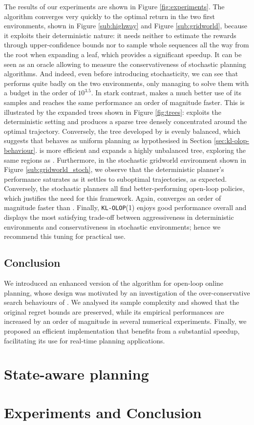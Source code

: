 The results of our experiments are shown in Figure \ref{fig:experiments}. The \OPD algorithm converges very quickly to the optimal return in the two first environments, shown in Figure \ref{sub:highway} and Figure \ref{sub:gridworld}, because it exploits their deterministic nature: it needs neither to estimate the rewards through upper-confidence bounds nor to sample whole sequences all the way from the root when expanding a leaf, which provides a significant speedup. It can be seen as an oracle allowing to measure the conservativeness of stochastic planning algorithms. And indeed, even before introducing stochasticity, we can see that \OLOP performs quite badly on the two environments, only managing to solve them with a budget in the order of $10^{3.5}$. In stark contrast, \KLOLOP makes a much better use of its samples and reaches the same performance an order of magnitude faster. This is illustrated by the expanded trees shown in Figure \ref{fig:trees}: \OPD exploits the deterministic setting and produces a sparse tree densely concentrated around the optimal trajectory. Conversely, the tree developed by \OLOP is evenly balanced, which suggests that \OLOP behaves as uniform planning as hypothesised in Section \ref{sec:kl-olop-behaviour}. \KLOLOP is more efficient and expands a highly unbalanced tree, exploring the same regions as \OPD. Furthermore, in the stochastic gridworld environment shown in Figure \ref{sub:gridworld_stoch}, we observe that the deterministic \OPD planner's performance saturates as it settles to suboptimal trajectories, as expected. Conversely, the stochastic planners all find better-performing open-loop policies, which justifies the need for this framework. Again, \KLOLOP converges an order of magnitude faster than \OLOP. Finally, \texttt{KL-OLOP}(1) enjoys good performance overall and displays the most satisfying trade-off between aggressiveness in deterministic environments and conservativeness in stochastic environments; hence we recommend this tuning for practical use.

\subsection{Conclusion}

We introduced an enhanced version of the \OLOP algorithm for open-loop online planning, whose design was motivated by an investigation of the over-conservative search behaviours of \OLOP. We analysed its sample complexity and showed that the original regret bounds are preserved, while its empirical performances are increased by an order of magnitude in several numerical experiments. Finally, we proposed an efficient implementation that benefits from a substantial speedup, facilitating its use for real-time planning applications.

\section{State-aware planning}

\section{Experiments and Conclusion}